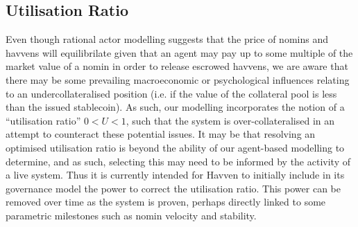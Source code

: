 \subsection{Utilisation Ratio} Even though rational actor modelling suggests that the price of nomins and havvens will equilibrilate
given that an agent may pay up to some multiple of the market value of a nomin in order to release escrowed havvens, we are aware that there may be some
prevailing macroeconomic or psychological influences relating to an undercollateralised position
(i.e. if the value of the collateral pool is less than the issued stablecoin). As such, our modelling incorporates the notion of a ``utilisation ratio''
\(0 < U < 1\), such that the system is over-collateralised in an attempt to counteract these potential issues. It may be that resolving an
optimised utilisation ratio is beyond the ability of our agent-based modelling to determine, and as such, selecting this may need to be
informed by the activity of a live system. Thus it is currently intended for Havven to initially include in its governance model the power
to correct the utilisation ratio. This power can be removed over time as the system is proven, perhaps directly linked to some parametric milestones such as nomin velocity and stability.


\pagebreak
